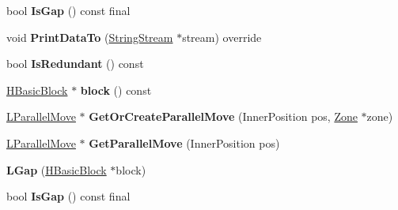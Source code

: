\begin{DoxyCompactItemize}
\item 
bool {\bfseries Is\+Gap} () const  final\hypertarget{classv8_1_1internal_1_1_l_gap_ae74844feaf20986b3e1f0c6e6da350f8}{}\label{classv8_1_1internal_1_1_l_gap_ae74844feaf20986b3e1f0c6e6da350f8}

\item 
void {\bfseries Print\+Data\+To} (\hyperlink{classv8_1_1internal_1_1_string_stream}{String\+Stream} $\ast$stream) override\hypertarget{classv8_1_1internal_1_1_l_gap_ad22b85643ee0ccf9a50f8cc0e73abc19}{}\label{classv8_1_1internal_1_1_l_gap_ad22b85643ee0ccf9a50f8cc0e73abc19}

\item 
bool {\bfseries Is\+Redundant} () const \hypertarget{classv8_1_1internal_1_1_l_gap_afd74524d060224489b5e7095e3354e1e}{}\label{classv8_1_1internal_1_1_l_gap_afd74524d060224489b5e7095e3354e1e}

\item 
\hyperlink{classv8_1_1internal_1_1_h_basic_block}{H\+Basic\+Block} $\ast$ {\bfseries block} () const \hypertarget{classv8_1_1internal_1_1_l_gap_a14ee6777d69e95f0c17ce3dcc0c6431e}{}\label{classv8_1_1internal_1_1_l_gap_a14ee6777d69e95f0c17ce3dcc0c6431e}

\item 
\hyperlink{classv8_1_1internal_1_1_l_parallel_move}{L\+Parallel\+Move} $\ast$ {\bfseries Get\+Or\+Create\+Parallel\+Move} (Inner\+Position pos, \hyperlink{classv8_1_1internal_1_1_zone}{Zone} $\ast$zone)\hypertarget{classv8_1_1internal_1_1_l_gap_afa07f91a1bdbab70770e57c45a4c93cd}{}\label{classv8_1_1internal_1_1_l_gap_afa07f91a1bdbab70770e57c45a4c93cd}

\item 
\hyperlink{classv8_1_1internal_1_1_l_parallel_move}{L\+Parallel\+Move} $\ast$ {\bfseries Get\+Parallel\+Move} (Inner\+Position pos)\hypertarget{classv8_1_1internal_1_1_l_gap_a80a7bd7cd4beef3be42928544646c5fb}{}\label{classv8_1_1internal_1_1_l_gap_a80a7bd7cd4beef3be42928544646c5fb}

\item 
{\bfseries L\+Gap} (\hyperlink{classv8_1_1internal_1_1_h_basic_block}{H\+Basic\+Block} $\ast$block)\hypertarget{classv8_1_1internal_1_1_l_gap_a065fcd3080fabb91cccfc541f7cf90f0}{}\label{classv8_1_1internal_1_1_l_gap_a065fcd3080fabb91cccfc541f7cf90f0}

\item 
bool {\bfseries Is\+Gap} () const  final\hypertarget{classv8_1_1internal_1_1_l_gap_ae74844feaf20986b3e1f0c6e6da350f8}{}\label{classv8_1_1internal_1_1_l_gap_ae74844feaf20986b3e1f0c6e6da350f8}


\end{DoxyCompactItemize}
